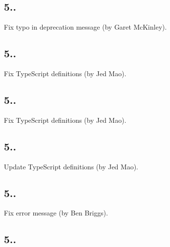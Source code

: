 \subsection*{5..}


\begin{DoxyItemize}
\item Fix typo in deprecation message (by Garet Mc\+Kinley).
\end{DoxyItemize}

\subsection*{5..}


\begin{DoxyItemize}
\item Fix Type\+Script definitions (by Jed Mao).
\end{DoxyItemize}

\subsection*{5..}


\begin{DoxyItemize}
\item Fix Type\+Script definitions (by Jed Mao).
\end{DoxyItemize}

\subsection*{5..}


\begin{DoxyItemize}
\item Update Type\+Script definitions (by Jed Mao).
\end{DoxyItemize}

\subsection*{5..}


\begin{DoxyItemize}
\item Fix error message (by Ben Briggs).
\end{DoxyItemize}

\subsection*{5..}


